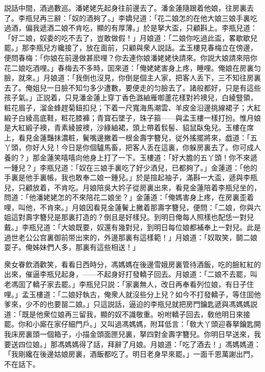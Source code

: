説話中間，酒過數巡。潘姥姥先起身往前邊去了。潘金蓮隨跟着他娘，往房裏去了。李瓶兒再三辭：「奴的酒夠了。」李嬌兒道：「花二娘怎的在他大娘三娘手裏吃過酒，偏我遞酒二娘不肯吃，顯的有厚薄。」於是拏大盃，只顧斟上。李瓶兒道：「好二娘，奴委的吃不去了，豈敢做假！」月娘道：「二娘你吃過此盃，畧歇歇兒罷。」那李瓶兒方纔接了，放在面前，只顧與衆人説話。孟玉樓見春梅立在傍邊，便問春梅：「你娘在前邊做甚麽哩？你去連你娘潘姥姥快請來。你説大娘請來陪你花二娘吃酒哩。」春梅去不多時，囬來道：「俺姥姥害身上疼，睡哩。俺娘在房裏匀臉，就來。」月娘道：「我倒也沒見，你倒是個主人家，把客人丢下，三不知往房裏去了。俺姐兒一日臉不知匀多少遭數，要便走的匀臉去了。諸般都好，只是有這些孩子氣。」正説着，只見潘金蓮上穿丁香色潞紬雁啣蘆花樣對衿襖兒，白綾豎領，粧花眉子，溜金蜂趕菊鈕扣兒；下着一尺寬海馬潮雲、羊皮金沿邊挑線裙子；大紅緞子白綾高底鞋，粧花膝褲；青寳石墜子，珠子箍——與孟玉樓一樣打扮。惟月娘是大紅緞子襖，青素綾披襖，沙綠紬裙，頭上帶着䯼髻、貂鼠臥兔兒。玉樓在席上，看見金蓮豔抹濃粧，鬢嘴邊撇着一根金壽字簪兒，従外搖擺將來，戯道：「五丫頭，你好人兒！今日是你個驢馬畜，把客人丢在這裏，你躲房裏去了。你可成人養的？」那金蓮笑嘻嘻向他身上打了一下。玉樓道：「好大膽的五丫頭！你不來遞一鍾兒？」李瓶兒道：「奴在三娘手裏吃了好少酒兒，已都夠了。」金蓮道：「他的手裏是他手裏帳，我也敢奉二娘一鍾兒。」於是揎起袖子，滿斟一大盃，遞與李瓶兒，只顧放着，不肯吃。月娘陪吳大妗子從房裏出來，看見金蓮陪着李瓶兒坐的，問道：「他潘姥姥怎的不來陪花二娘坐？」金蓮道：「俺媽害身上疼，在房裏歪着哩，叫他，不肯來。」月娘因看見金蓮鬢上撇着那壽字簪兒，便問：「二娘，你與六姐這對壽字簪兒是那裏打造的？倒且是好樣兒。到明日俺每人照樣也配恁一對兒戴。」李瓶兒道：「大娘既要，奴還有幾對兒，到明日每位娘都補奉上一對兒。此是過世老公公宫裏御前带出來的，外邊那裏有這樣範！」月娘道：「奴取笑，鬬二娘耍子。俺姊妹們人多，那裏有這些相送！」

衆女眷飲酒歡笑，看看日西時分，馮媽媽在後邊雪娥房裏管待酒飯，吃的臉紅紅的出來，催逼李瓶兒起身，——不起身好打發轎子回去。月娘道：「二娘不去罷，叫老馮囬了轎子家去罷。」李瓶兒只説：「家裏無人，改日再奉看列位娘，有日子住哩。」孟玉樓道：「二娘好執古，俺衆人就沒些分上兒？如今不打發轎子，等住囬他爹來，少不的也要㽞二娘。」只這説話，逼迫的李瓶兒就把房門鑰匙遞與馮媽媽説道：「既是他衆位娘再三留我，顯的奴不識敬重。吩咐轎子回去，敎他明日來接罷。你和小廝在家仔細門戶。」又叫過馮媽媽，附耳低言：「敎大丫頭迎春拏鑰匙開我床房裏頭一個箱子，小描金頭面匣兒裏，拏四對金壽字簪兒。你明日早送來，我要送四位娘。」那馮媽媽得了話，拜辭了月娘。月娘道：「吃了酒去！」馮媽媽道：「我剛纔在後邊姑娘房裏，酒飯都吃了。明日老身早來罷。」一面千恩萬謝出門，不在話下。

